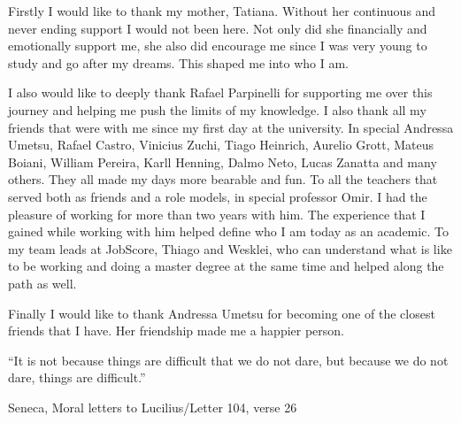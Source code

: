 \begin{agradecimentos}
  Firstly I would like to thank my mother, Tatiana. Without her continuous and never ending support
  I would not been here. Not only did she financially and emotionally support me, she also
  did encourage me since I was very young to study and go after my dreams. This shaped me
  into who I am.

  I also would like to deeply thank Rafael Parpinelli for supporting me over this journey
  and helping me push the limits of my knowledge. I also thank all my friends that were with
  me since my first day at the university. In special Andressa Umetsu, Rafael Castro, Vinicius Zuchi,
  Tiago Heinrich,
  Aurelio Grott, Mateus Boiani, William Pereira, Karll Henning, Dalmo Neto, Lucas Zanatta and many others.
  They all made my days more bearable and fun.
  To all the teachers that served both as friends and a role models,
  in special professor Omir. I had the pleasure of working for more than two years with him.
  The experience that I gained while working with him helped define who I am today as an academic.
  To my team leads at JobScore, Thiago and Wesklei,
  who can understand what is like to be working and doing a master
  degree at the same time and helped along the path as well.

  Finally I would like to thank Andressa Umetsu for becoming one of the closest friends that
  I have. Her friendship made me a happier person.
\end{agradecimentos}

\begin{epigrafe}
  ``It is not because things are difficult that we do not dare, but because we do not dare, things are difficult.''
  \\
  \par
  Seneca, Moral letters to Lucilius/Letter 104, verse 26
\end{epigrafe}




